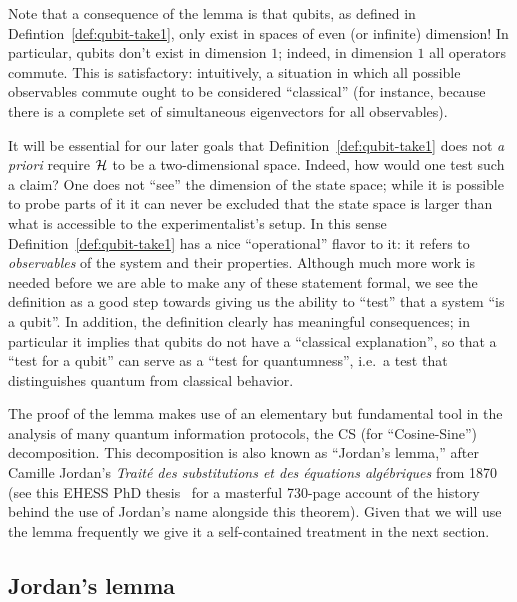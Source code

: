 Note that a consequence of the lemma is that qubits, as defined in Defintion~\ref{def:qubit-take1}, only exist in spaces of even (or infinite) dimension! In particular, qubits don't exist in dimension $1$; indeed, in dimension $1$ all operators commute. This is satisfactory: intuitively, a situation in which all possible observables commute ought to be considered ``classical'' (for instance, because there is a complete set of simultaneous eigenvectors for all observables). 

It will be essential for our later goals that Definition~\ref{def:qubit-take1} does not \emph{a priori} require $\mathcal{H}$ to be a two-dimensional space. Indeed, how would one test such a claim? One does not ``see'' the dimension of the state space; while it is possible to probe parts of it it can never be excluded that the state space is larger than what is accessible to the experimentalist's setup. In this sense Definition~\ref{def:qubit-take1} has a nice ``operational'' flavor to it: it refers to \emph{observables} of the system and their properties.  Although much more work is needed before we are able to make any of these statement formal, we see the definition as a good step towards giving us the ability to ``test'' that a system ``is a qubit''. In addition, the definition clearly has meaningful consequences; in particular it implies that qubits do not have a ``classical explanation'', so that a ``test for a qubit'' can serve as a ``test for quantumness'', i.e.\ a test that distinguishes quantum from classical behavior. 

The proof of the lemma makes use of an elementary but fundamental tool in the analysis of many quantum information protocols, the CS (for ``Cosine-Sine'') decomposition. This decomposition is also known as ``Jordan's lemma,'' after Camille Jordan's \emph{Traité des substitutions et des équations algébriques} from 1870 (see this EHESS PhD thesis~\cite{brechenmacher2006histoire} for a masterful 730-page account of the history behind the use of Jordan's name alongside this theorem). Given that we will use the lemma frequently we give it a self-contained treatment in the next section. 

\subsection{Jordan's lemma}


